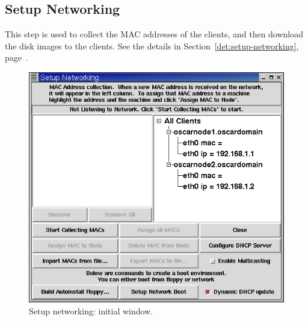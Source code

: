 
\subsection{Setup Networking}

This step is used to collect the MAC addresses of the clients, and
then download the disk images to the clients.  See the details in
Section~\ref{det:setup-networking},
page~\pageref{det:setup-networking}.

\begin{figure}[h!]
  \begin{center}
    \centerline{\includegraphics[scale=\imgscale]{figs/6a_sbs-collect-mac1}}
    \caption{Setup networking: initial window.}
    \label{fig:sbs-setup-network1}
  \end{center}
\end{figure}



